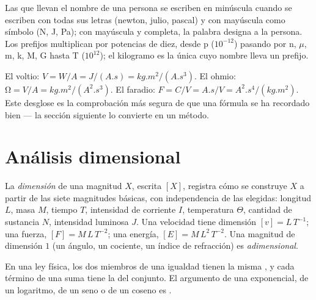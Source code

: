 \begin{remark}\label{rem:b1:units-dimensions:names}
Las  que llevan el nombre de una persona se escriben en minúscula
cuando se escriben con todas sus letras (newton, julio, pascal) y con
mayúscula como símbolo (\unit{N}, \unit{J}, \unit{Pa}); con mayúscula y
completa, la palabra designa a la persona. Los prefijos multiplican por
potencias de diez, desde p ($10^{-12}$) pasando por n, $\mu$, m, k, M, G
hasta T ($10^{12}$); el kilogramo es la única  cuyo nombre
lleva un prefijo.
\end{remark}

\begin{example}\label{ex:b1:units-dimensions:unpack}
El voltio: $\unit{V} = \unit{W/A} = \unit{J/(A.s)} = \unit{kg.m^2/(A.s^3)}$.
El ohmio: $\unit{\ohm} = \unit{V/A} = \unit{kg.m^2/(A^2.s^3)}$. El faradio:
$\unit{F} = \unit{C/V} = \unit{A.s/V} = \unit{A^2.s^4/(kg.m^2)}$. Este
desglose es la comprobación más segura de que una fórmula se ha recordado
bien --- la sección siguiente lo convierte en un método.
\end{example}

\section{Análisis dimensional}

\begin{definition}[Dimensión]\label{def:b1:units-dimensions:dimension}
La \emph{dimensión} de una magnitud $X$, escrita $[X]$, registra cómo se
construye $X$ a partir de las siete magnitudes básicas, con independencia
de las  elegidas: longitud $L$, masa $M$, tiempo $T$, intensidad
de corriente $I$, temperatura $\Theta$, cantidad de sustancia $N$,
intensidad luminosa $J$. Una velocidad tiene dimensión $[v] = L\,T^{-1}$;
una fuerza, $[F] = M\,L\,T^{-2}$; una energía, $[E] = M\,L^2\,T^{-2}$. Una
magnitud de dimensión $1$ (un ángulo, un cociente, un índice de
refracción) es \emph{adimensional}.
\end{definition}

\begin{theorem}\label{thm:b1:units-dimensions:homogeneity}
En una ley física, los dos miembros de una igualdad tienen la misma
, y cada término de una suma tiene la  del conjunto. El
argumento de una exponencial, de un logaritmo, de un seno o de un coseno
es .
\end{theorem}

